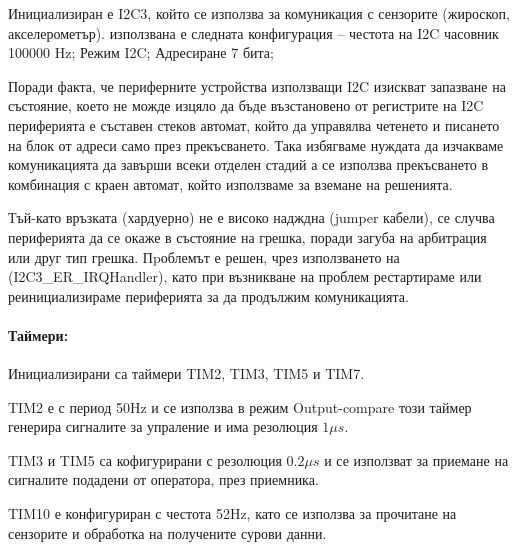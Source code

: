 Инициализиран е I2C3,
който се използва за комуникация с сензорите (жироскоп, акселерометър).
използвана е следната конфигурация --
честота на I2C часовник 100000 Hz;
Режим I2C;
Адресиране 7 бита;

Поради факта, че периферните устройства използващи I2C 
изискват запазване на състояние, което не можде изцяло да 
бъде възстановено от регистрите на I2C периферията
е съставен стеков автомат, който да управялва четенето и 
писането на блок от адреси само през прекъсването.
Така избягваме нуждата да изчакваме комуникацията да завърши
всеки отделен стадий а се използва прекъсването в комбинация
с краен автомат, който използваме за вземане на решенията.

Тъй-като връзката (хардуерно) не е високо надждна
(jumper кабели), се случва периферията да се окаже в
състояние на грешка, поради загуба на арбитрация или
друг тип грешка.
Пpоблемът е решен, чрез използването на (I2C3\_ER\_IRQHandler),
като при възникване на проблем рестартираме или реинициализираме
периферията за да продължим комуникацията.

\paragraph{Таймери:}

Инициализирани са таймери TIM2, TIM3, TIM5 и TIM7. 

TIM2 е с период 50Hz и се използва в режим Output-compare
този таймер генерира сигналите за упраление и има резолюция \(1\mu s\).

TIM3 и TIM5 са кофигурирани с резолюция \(0.2\mu s\) и се използват за приемане на сигналите подадени от оператора, през приемника.

TIM10 е конфигуриран с честота 52Hz, като се използва за прочитане на сензорите и обработка на получените сурови данни.


